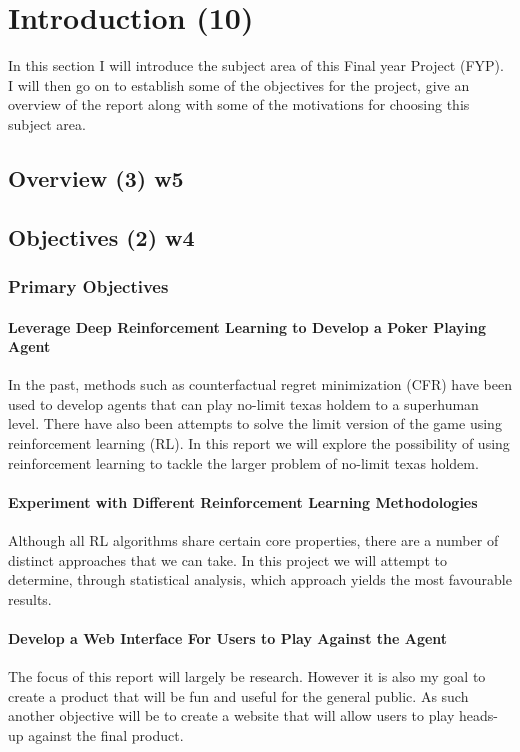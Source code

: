 \chapter{Introduction (10)}
\label{ch:intro}
In this section I will introduce the subject area of this Final year Project (FYP).
I will then go on to establish some of the objectives for the project, give an overview of the report along with some of
the motivations for choosing this subject area.


\section{Overview (3) w5}
\label{sec:overview}


\section{Objectives (2) w4}
\label{sec:objectives}
\subsection{Primary Objectives}
\label{subsec:primaryObjectives}
\subsubsection{Leverage Deep Reinforcement Learning to Develop a Poker Playing Agent}
In the past, methods such as counterfactual regret minimization (CFR) have been used to develop agents that can
play no-limit texas holdem to a superhuman level.
There have also been attempts to solve the limit version of the game using reinforcement learning (RL).
In this report we will explore the possibility of using reinforcement learning to tackle the larger problem of
no-limit texas holdem.

\subsubsection{Experiment with Different Reinforcement Learning Methodologies}
Although all RL algorithms share certain core properties, there are a number of distinct approaches that we can take.
 In this project we will attempt to determine, through statistical analysis, which approach yields the most favourable results.

\subsubsection{Develop a Web Interface For Users to Play Against the Agent}
The focus of this report will largely be research.
 However it is also my goal to create a product that will be fun and useful for the general public.
 As such another objective will be to create a website that will allow users to play heads-up against the final product.

